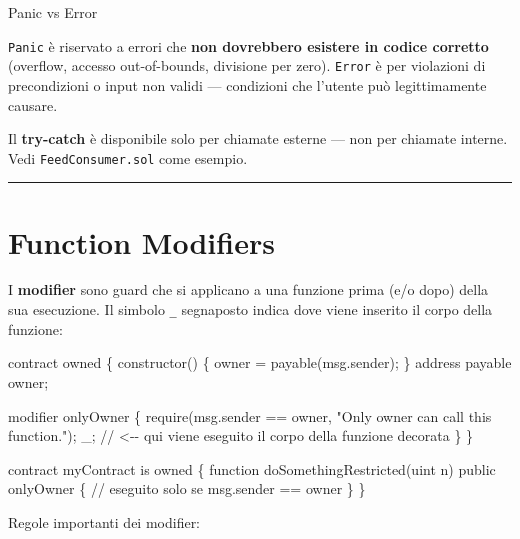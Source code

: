 \documentclass[
  italian,
  openany]{book}
\newenvironment{Shaded}{\begin{snugshade}}{\end{snugshade}}
\newcommand{\NormalTok}[1]{#1}
\begin{document}
\begin{calloutdefinition}{Panic vs Error}

\texttt{Panic} è riservato a errori che \textbf{non dovrebbero esistere
in codice corretto} (overflow, accesso out-of-bounds, divisione per
zero). \texttt{Error} è per violazioni di precondizioni o input non
validi --- condizioni che l'utente può legittimamente causare.

\end{calloutdefinition}

Il \textbf{try-catch} è disponibile solo per chiamate esterne --- non
per chiamate interne. Vedi \texttt{FeedConsumer.sol} come esempio.

\begin{center}\rule{0.5\linewidth}{0.5pt}\end{center}

\section{Function Modifiers}\label{function-modifiers}

I \textbf{modifier} sono guard che si applicano a una funzione prima
(e/o dopo) della sua esecuzione. Il simbolo \texttt{\_} segnaposto
indica dove viene inserito il corpo della funzione:

\begin{Shaded}
\begin{Highlighting}[]
\NormalTok{contract owned \{}
\NormalTok{    constructor() \{ owner = payable(msg.sender); \}}
\NormalTok{    address payable owner;}

\NormalTok{    modifier onlyOwner \{}
\NormalTok{        require(msg.sender == owner, "Only owner can call this function.");}
\NormalTok{        \_;   // \textless{}{-}{-} qui viene eseguito il corpo della funzione decorata}
\NormalTok{    \}}
\NormalTok{\}}

\NormalTok{contract myContract is owned \{}
\NormalTok{    function doSomethingRestricted(uint n) public onlyOwner \{}
\NormalTok{        // eseguito solo se msg.sender == owner}
\NormalTok{    \}}
\NormalTok{\}}
\end{Highlighting}
\end{Shaded}

Regole importanti dei modifier:
\end{document}
